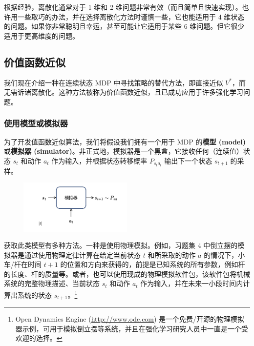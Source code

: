 根据经验，离散化通常对于 1 维和 2 维问题非常有效（而且简单且快速实现）。也许用一些取巧的办法，并在选择离散化方法时谨慎一些，它也能适用于 4 维状态的问题。如果你非常聪明且幸运，甚至可能让它适用于某些 6 维问题。但它很少适用于更高维度的问题。

\subsection{价值函数近似}

我们现在介绍一种在连续状态 MDP 中寻找策略的替代方法，即直接近似 $V^*$，而无需诉诸离散化。这种方法被称为价值函数近似，且已成功应用于许多强化学习问题。

\subsubsection*{使用模型或模拟器}

为了开发值函数近似算法，我们将假设我们拥有一个用于 MDP 的\textbf{模型 (model)} 或\textbf{模拟器 (simulator)}。非正式地，模拟器是一个黑盒，它接收任何（连续值）状态 $s_t$ 和动作 $a_t$ 作为输入，并根据状态转移概率 $P_{s_t a_t}$ 输出下一个状态 $s_{t+1}$ 的采样。

\begin{figure}[H]
    \centering
    \includegraphics[width=0.5\textwidth]{figs/simulator.pdf}
\end{figure}

获取此类模型有多种方法。一种是使用物理模拟。例如，习题集 4 中倒立摆的模拟器是通过使用物理定律计算在给定当前状态 $t$ 和所采取的动作 $a$ 的情况下，小车/杆在时间 $t+1$ 的位置和方向来获得的，前提是已知系统的所有参数，例如杆的长度、杆的质量等。或者，也可以使用现成的物理模拟软件包，该软件包将机械系统的完整物理描述、当前状态 $s_t$ 和动作 $a_t$ 作为输入，并在未来一小段时间内计算出系统的状态 $s_{t+1}$。\footnote{Open Dynamics Engine (\url{http://www.ode.com}) 是一个免费/开源的物理模拟器示例，可用于模拟倒立摆等系统，并且在强化学习研究人员中一直是一个受欢迎的选择。}

